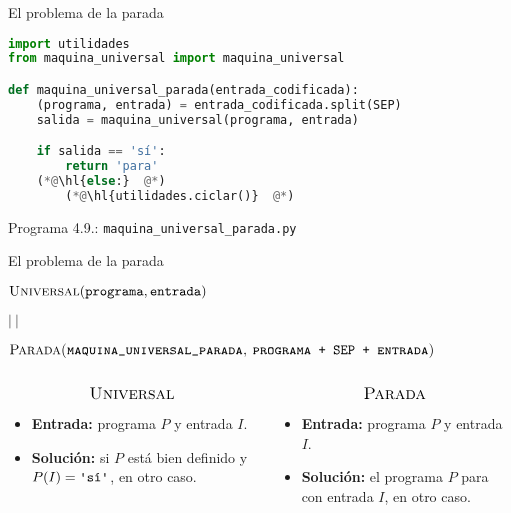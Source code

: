 \documentclass[10pt,xcolor=dvipsnames,aspectratio=169,spanish]{beamer}
\makeatletter
\let\HL\hl
\renewcommand\hl{%
  \let\set@color\beamerorig@set@color
  \let\reset@color\beamerorig@reset@color
  \HL}
\newcommand{\palabra}[1]{\texttt{\textquotesingle{}{#1}\textquotesingle{}}}
\makeatother
\begin{document}

\begin{frame}[fragile]{El problema de la parada}

\begin{lstlisting}[language=Python]
import utilidades
from maquina_universal import maquina_universal

def maquina_universal_parada(entrada_codificada):
    (programa, entrada) = entrada_codificada.split(SEP)
    salida = maquina_universal(programa, entrada)

    if salida == 'sí':
        return 'para'
    (*@\hl{else:}  @*)
        (*@\hl{utilidades.ciclar()}  @*)
\end{lstlisting}
\vspace*{-4mm}
\begin{center}
{\small Programa 4.9.: \texttt{maquina\_universal\_parada.py}}
\end{center}

\end{frame}



\begin{frame}{El problema de la parada}

\begin{center}
    \large{$\textsc{Universal}(\texttt{programa}, \texttt{entrada})$}
    
    \large{$|\:|$}
    
    \large{$\textsc{Parada(\texttt{maquina\_universal\_parada}, \texttt{programa + SEP + entrada})}$}
\end{center}

\begin{columns}
\begin{column}{0.5\textwidth}
\begin{framed}
$$\text{\large \textsc{Universal}}$$

\begin{itemize}
    \item \textbf{Entrada:} programa $P$ y entrada $I$.
    \item \textbf{Solución:} \palabra{sí} si $P$ está bien definido y $P(I)=\text{\palabra{sí}}$, \palabra{no} en otro caso.
\end{itemize}
\end{framed}
\end{column}
\begin{column}{0.5\textwidth}  %
\begin{framed}
$$\text{\large \textsc{Parada}}$$

\begin{itemize}
    \item \textbf{Entrada:} programa $P$ y entrada $I$.
    \item \textbf{Solución:} \palabra{si} el programa $P$ para con entrada $I$, \palabra{no} en otro caso.
\end{itemize}
\end{framed}
\end{column}
\end{columns}

\end{frame}
\end{document}
